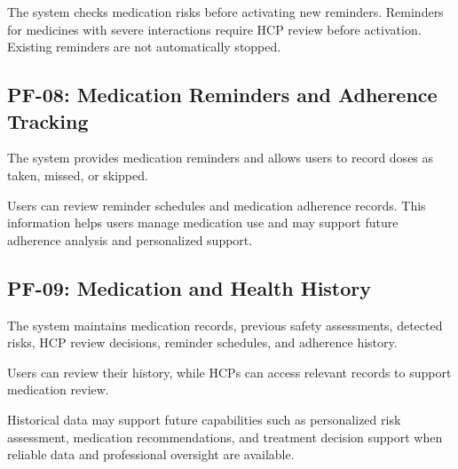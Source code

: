 The system checks medication risks
before activating new reminders.
Reminders for medicines with severe
interactions require HCP review before
activation. Existing reminders are not
automatically stopped.

\subsection{PF-08: Medication Reminders and Adherence Tracking}

The system provides medication reminders
and allows users to record doses as
taken, missed, or skipped.

Users can review reminder schedules
and medication adherence records.
This information helps users manage
medication use and may support future
adherence analysis and personalized support.

\subsection{PF-09: Medication and Health History}

The system maintains medication records,
previous safety assessments, detected risks,
HCP review decisions, reminder schedules,
and adherence history.

Users can review their history, while HCPs
can access relevant records to support
medication review.

Historical data may support future
capabilities such as personalized risk
assessment, medication recommendations,
and treatment decision support when
reliable data and professional oversight
are available.
